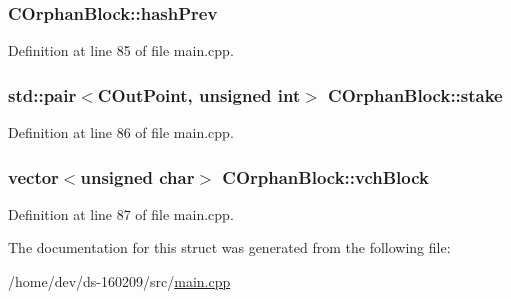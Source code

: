 \subsubsection[{hash\+Prev}]{ C\+Orphan\+Block\+::hash\+Prev}\label{struct_c_orphan_block_a8c6e5d47d1da746d59feefdc0eb9f55c}


Definition at line 85 of file main.\+cpp.

\hypertarget{struct_c_orphan_block_a11bf8c661061349166e335ba0dedd7fb}{}
\subsubsection[{stake}]{\setlength{\rightskip}{0pt plus 5cm}std\+::pair$<${\bf C\+Out\+Point}, unsigned int$>$ C\+Orphan\+Block\+::stake}\label{struct_c_orphan_block_a11bf8c661061349166e335ba0dedd7fb}


Definition at line 86 of file main.\+cpp.

\hypertarget{struct_c_orphan_block_a6d63003bce14214976acc149cd4813e8}{}
\subsubsection[{vch\+Block}]{\setlength{\rightskip}{0pt plus 5cm}vector$<$unsigned char$>$ C\+Orphan\+Block\+::vch\+Block}\label{struct_c_orphan_block_a6d63003bce14214976acc149cd4813e8}


Definition at line 87 of file main.\+cpp.



The documentation for this struct was generated from the following file\+:\begin{DoxyCompactItemize}
\item 
/home/dev/ds-\/160209/src/\hyperlink{main_8cpp}{main.\+cpp}\end{DoxyCompactItemize}
